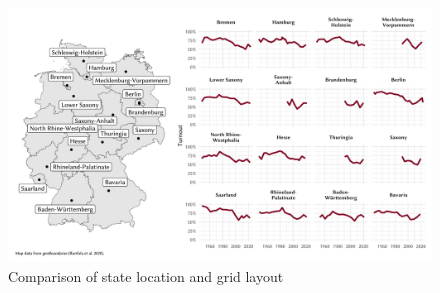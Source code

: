 \documentclass[
]{scrartcl}
\begin{document}
\begin{landscape}

\begin{figure}

{\centering \includegraphics{cbfiles/map-vs-grid-plot-1} 

}

\caption{Comparison of state location and grid layout}\label{fig:map-vs-grid-plot}
\end{figure}

\end{landscape}

\printbibliography[title=References]
\end{document}
